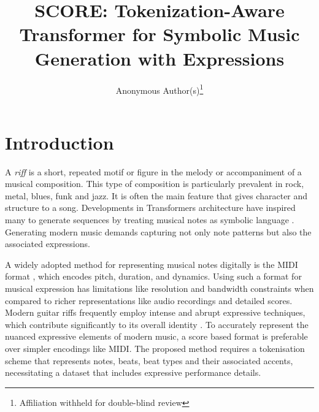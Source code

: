 \documentclass{article}
\title{SCORE: Tokenization-Aware Transformer for Symbolic Music Generation with Expressions}
\author{%
Anonymous Author(s)\thanks{Affiliation withheld for double-blind review}%
\protect\footnotemark[1]}
\date{}
\begin{document}

\saythanks{}

\section{Introduction}\label{sec:introduction}
A \textit{riff} is a short, repeated motif or figure in the melody or accompaniment of a 
musical composition. \cite{randel:86} This type of composition is particularly prevalent 
in rock, metal, blues, funk and jazz. It is often the main feature that gives character 
and structure to a song. Developments in Transformers architecture have inspired 
many to generate sequences by treating musical notes as symbolic language
\cite{Vaswani2}
\cite{agostinelli2023musiclmgeneratingmusictext} 
\cite{copet2024simplecontrollablemusicgeneration} 
\cite{doi:10.1177/14727978251337904} 
\cite{symbolic} 
\cite{app13074543} 
\cite{10.1145/3394171.3413671}
\cite{wu2020jazz}
\cite{ens2020mmm}
\cite{dong2023multitrack}
\cite{yu2022museformer}. 
Generating modern music demands capturing not only note patterns but also the associated expressions. 

A widely adopted method for representing musical notes digitally is the MIDI format \cite{craig2025midifileformat}, 
which encodes pitch, duration, and dynamics. Using such a format for musical expression has limitations like resolution 
and bandwidth constraints \cite{midi_short} when compared to richer representations like 
audio recordings and detailed scores. Modern guitar riffs frequently employ intense and abrupt expressive
techniques, which contribute significantly to its overall identity \cite{vallejo2021development}. To accurately represent the nuanced 
expressive elements of modern music, a score based format is preferable over simpler encodings like MIDI.
The proposed method requires a tokenisation scheme that represents notes, beats, beat types and their associated accents, 
necessitating a dataset that includes expressive performance details.
\end{document}
